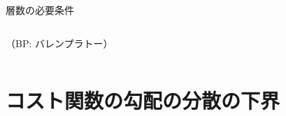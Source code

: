 \documentclass[dvipdfmx,10pt,aspectratio=169]{beamer}
\begin{document}
\begin{frame}{層数の必要条件}
\begin{columns}
\begin{column}{0.35\textwidth}
            \vspace*{10pt}
            （BP: バレンプラトー）
        \end{column}
    \end{columns}
\end{frame}






\section{コスト関数の勾配の分散の下界}
\end{document}
